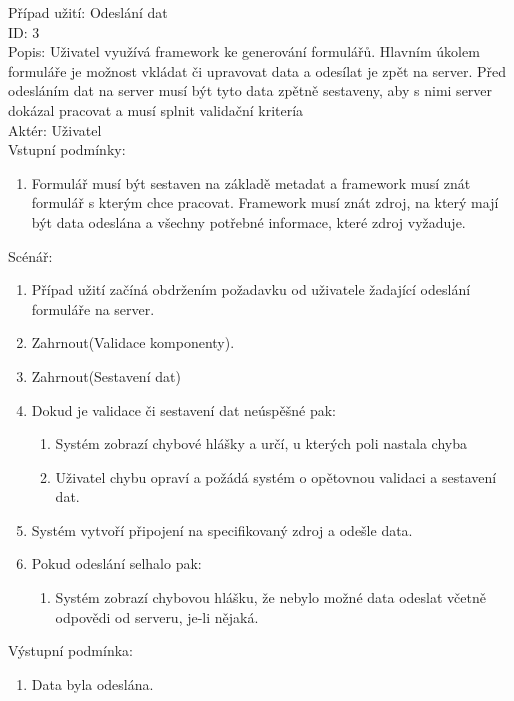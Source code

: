 Případ užití: Odeslání dat\\
ID: 3\\
Popis: 
Uživatel využívá framework ke generování formulářů. Hlavním úkolem formuláře je možnost vkládat či upravovat data a odesílat je zpět na server. Před odesláním dat na server musí být tyto data zpětně sestaveny, aby s nimi server dokázal pracovat a musí splnit validační kritería
\\
Aktér: Uživatel\\
Vstupní podmínky:
\begin{enumerate}
\item Formulář musí být sestaven na základě metadat a framework musí znát formulář s kterým chce pracovat. Framework musí znát zdroj, na který mají být data odeslána a všechny potřebné informace, které zdroj vyžaduje.
\end{enumerate}
Scénář:
\begin{enumerate}
\item Případ užití začíná obdržením požadavku od uživatele žadající odeslání formuláře na server.
\item Zahrnout(Validace komponenty).
\item Zahrnout(Sestavení dat)
\item Dokud je validace či sestavení dat neúspěšné pak:
\begin{enumerate}
\item Systém zobrazí chybové hlášky a určí, u kterých poli nastala chyba
\item Uživatel chybu opraví a požádá systém o opětovnou validaci a sestavení dat.
\end{enumerate}
\item Systém vytvoří připojení na specifikovaný zdroj a odešle data.
\item Pokud odeslání selhalo pak:
\begin{enumerate}
\item Systém zobrazí chybovou hlášku, že nebylo možné data odeslat včetně odpovědi od serveru, je-li nějaká.
\end{enumerate}
\end{enumerate}

Výstupní podmínka:
\begin{enumerate}
\item Data byla odeslána.
\end{enumerate}


